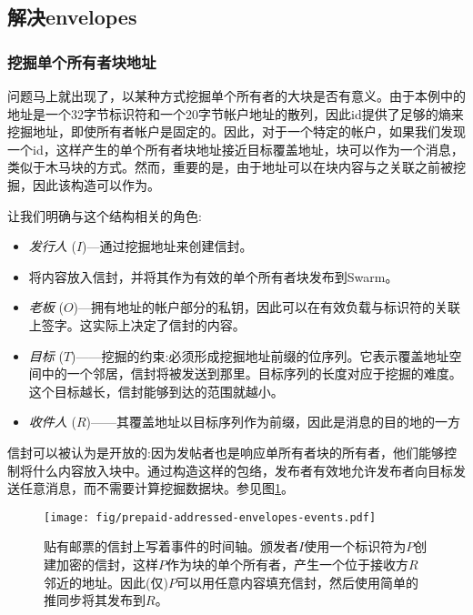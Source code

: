 \subsection{解决envelopes\statusgreen}\label{sec:addressed-envelopes}

\subsubsection{挖掘单个所有者块地址}

问题马上就出现了，以某种方式挖掘单个所有者的大块是否有意义。由于本例中的地址是一个32字节标识符和一个20字节帐户地址的散列，因此id提供了足够的熵来挖掘地址，即使所有者帐户是固定的。因此，对于一个特定的帐户，如果我们发现一个id，这样产生的单个所有者块地址接近目标覆盖地址，块可以作为一个消息，类似于木马块的方式。然而，重要的是，由于地址可以在块内容与之关联之前被挖掘，因此该构造可以作为。

让我们明确与这个结构相关的角色:

\begin{itemize}
\item \emph{发行人} ($I$)—通过挖掘地址来创建信封。 
\item 将内容放入信封，并将其作为有效的单个所有者块发布到Swarm。
\item \emph{老板} ($O$)—拥有地址的帐户部分的私钥，因此可以在有效负载与标识符的关联上签字。这实际上决定了信封的内容。
\item \emph{目标} ($T$)——挖掘的约束:必须形成挖掘地址前缀的位序列。它表示覆盖地址空间中的一个邻居，信封将被发送到那里。目标序列的长度对应于挖掘的难度。这个目标越长，信封能够到达的范围就越小。
\item \emph{收件人} ($R$)——其覆盖地址以目标序列作为前缀，因此是消息的目的地的一方
\end{itemize}

信封可以被认为是开放的:因为发帖者也是响应单所有者块的所有者，他们能够控制将什么内容放入块中。通过构造这样的包络，发布者有效地允许发布者向目标发送任意消息，而不需要计算挖掘数据块。参见图\ref{fig:addressed-envelope-events}。 


\begin{figure}[htbp]
   \centering
   \texttt{[image: fig/prepaid-addressed-envelopes-events.pdf]}
   \caption[贴有邮票，写有地址的信封，事件的时间表]{贴有邮票的信封上写着事件的时间轴。颁发者$I$使用一个标识符为$P$创建加密的信封，这样$P$作为块的单个所有者，产生一个位于接收方$R$邻近的地址。因此(仅)$P$可以用任意内容填充信封，然后使用简单的推同步将其发布到$R$。}
   \label{fig:addressed-envelope-events}
\end{figure}

